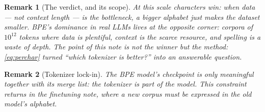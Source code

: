 \documentclass[11pt]{article}
\newtheorem{remark}{Remark}
\begin{document}
\begin{remark}[The verdict, and its scope]
At this scale \emph{characters win}: when data --- not context length
--- is the bottleneck, a bigger alphabet just makes the dataset
smaller. BPE's dominance in real LLMs lives at the opposite corner:
corpora of $10^{12}$ tokens where data is plentiful, context is the
scarce resource, and spelling is a waste of depth. The point of this
note is not the winner but the method: \eqref{eq:perchar} turned
``which tokenizer is better?'' into an answerable question.
\end{remark}

\begin{remark}[Tokenizer lock-in]
The BPE model's checkpoint is only meaningful together with its merge
list: the tokenizer is part of the model. This constraint returns in
the finetuning note, where a new corpus must be expressed in the old
model's alphabet.
\end{remark}
\end{document}
